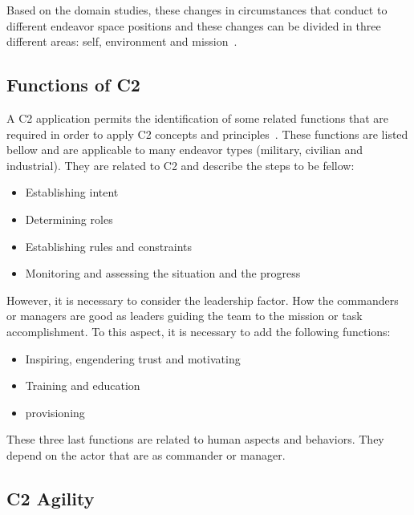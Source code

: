 Based on the domain studies, these changes in circumstances that conduct to different endeavor space positions and these changes can be divided in three different areas: self, environment and mission~\cite{Alberts2006}.


\subsection {Functions of C2}

A C2 application permits the identification of some related functions that are required in order to apply C2 concepts and principles~\cite{Alberts2006}. These functions are listed bellow and are applicable to many endeavor types (military, civilian and industrial). They are related to C2 and describe the steps to be fellow:
\begin{itemize}
    \item Establishing intent
    \item Determining roles
    \item Establishing rules and constraints
    \item Monitoring and assessing the situation and the progress
\end{itemize}

However, it is necessary to consider the leadership factor. How the commanders or managers are good as leaders guiding the team to the mission or task accomplishment. To this aspect, it is necessary to add the following functions:

\begin{itemize}
    \item Inspiring, engendering trust and motivating
    \item Training and education
    \item provisioning
\end{itemize}

These three last functions are related to human aspects and behaviors. They depend on the actor that are as commander or manager.






\subsection {\gls{C2 Agility}}

